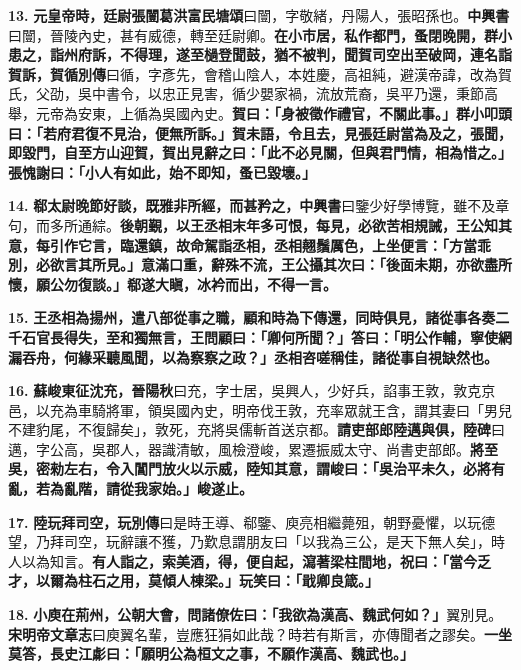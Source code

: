 \textbf{13.} \textbf{元皇帝時，廷尉張闓}{\footnotesize \textbf{葛洪富民塘頌}曰闓，字敬緒，丹陽人，張昭孫也。\textbf{中興書}曰闓，晉陵內史，甚有威德，轉至廷尉卿。}\textbf{在小市居，私作都門，蚤閉晚開，群小患之，詣州府訴，不得理，遂至檛登聞鼓，猶不被判，聞賀司空出至破岡，連名詣賀訴，}{\footnotesize \textbf{賀循別傳}曰循，字彥先，會稽山陰人，本姓慶，高祖純，避漢帝諱，改為賀氏，父劭，吳中書令，以忠正見害，循少嬰家禍，流放荒裔，吳平乃還，秉節高舉，元帝為安東，上循為吳國內史。}\textbf{賀曰：「身被徵作禮官，不關此事。」群小叩頭曰：「若府君復不見治，便無所訴。」賀未語，令且去，見張廷尉當為及之，張聞，即毀門，自至方山迎賀，賀出見辭之曰：「此不必見關，但與君門情，相為惜之。」張愧謝曰：「小人有如此，始不即知，蚤已毀壞。」}

\textbf{14.} \textbf{郗太尉晚節好談，既雅非所經，而甚矜之，}{\footnotesize \textbf{中興書}曰鑒少好學博覽，雖不及章句，而多所通綜。}\textbf{後朝覲，以王丞相末年多可恨，每見，必欲苦相規誡，王公知其意，每引作它言，臨還鎮，故命駕詣丞相，丞相翹鬚厲色，上坐便言：「方當乖別，必欲言其所見。」意滿口重，辭殊不流，王公攝其次曰：「後面未期，亦欲盡所懷，願公勿復談。」郗遂大瞋，冰衿而出，不得一言。}

\textbf{15.} \textbf{王丞相為揚州，遣八部從事之職，顧和時為下傳還，同時俱見，諸從事各奏二千石官長得失，至和獨無言，王問顧曰：「卿何所聞？」答曰：「明公作輔，寧使網漏吞舟，何緣采聽風聞，以為察察之政？」丞相咨嗟稱佳，諸從事自視缺然也。}

\textbf{16.} \textbf{蘇峻東征沈充，}{\footnotesize \textbf{晉陽秋}曰充，字士居，吳興人，少好兵，諂事王敦，敦克京邑，以充為車騎將軍，領吳國內史，明帝伐王敦，充率眾就王含，謂其妻曰「男兒不建豹尾，不復歸矣」，敦死，充將吳儒斬首送京都。}\textbf{請吏部郎陸邁與俱，}{\footnotesize \textbf{陸碑}曰邁，字公高，吳郡人，器識清敏，風檢澄峻，累遷振威太守、尚書吏部郎。}\textbf{將至吳，密勑左右，令入閶門放火以示威，陸知其意，謂峻曰：「吳治平未久，必將有亂，若為亂階，請從我家始。」峻遂止。}

\textbf{17.} \textbf{陸玩拜司空，}{\footnotesize \textbf{玩別傳}曰是時王導、郗鑒、庾亮相繼薨殂，朝野憂懼，以玩德望，乃拜司空，玩辭讓不獲，乃歎息謂朋友曰「以我為三公，是天下無人矣」，時人以為知言。}\textbf{有人詣之，索美酒，得，便自起，瀉著梁柱間地，祝曰：「當今乏才，以爾為柱石之用，莫傾人棟梁。」玩笑曰：「戢卿良箴。」}

\textbf{18.} \textbf{小庾在荊州，公朝大會，問諸僚佐曰：「我欲為漢高、魏武何如？」}{\footnotesize 翼別見。\textbf{宋明帝文章志}曰庾翼名輩，豈應狂狷如此哉？時若有斯言，亦傳聞者之謬矣。}\textbf{一坐莫答，長史江虨曰：「願明公為桓文之事，不願作漢高、魏武也。」}

